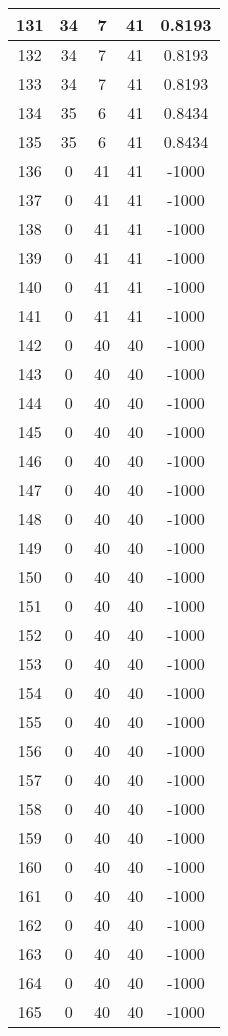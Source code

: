 \documentclass[letterpaper, 12pt]{article}
\begin{document}
\begin{longtable}{|c|c|c|c|c|}
\hline
131 & 34 & 7 & 41 & 0.8193 \\
\hline
132 & 34 & 7 & 41 & 0.8193 \\
\hline
133 & 34 & 7 & 41 & 0.8193 \\
\hline
134 & 35 & 6 & 41 & 0.8434 \\
\hline
135 & 35 & 6 & 41 & 0.8434 \\
\hline
136 & 0 & 41 & 41 & -1000 \\
\hline
137 & 0 & 41 & 41 & -1000 \\
\hline
138 & 0 & 41 & 41 & -1000 \\
\hline
139 & 0 & 41 & 41 & -1000 \\
\hline
140 & 0 & 41 & 41 & -1000 \\
\hline
141 & 0 & 41 & 41 & -1000 \\
\hline
142 & 0 & 40 & 40 & -1000 \\
\hline
143 & 0 & 40 & 40 & -1000 \\
\hline
144 & 0 & 40 & 40 & -1000 \\
\hline
145 & 0 & 40 & 40 & -1000 \\
\hline
146 & 0 & 40 & 40 & -1000 \\
\hline
147 & 0 & 40 & 40 & -1000 \\
\hline
148 & 0 & 40 & 40 & -1000 \\
\hline
149 & 0 & 40 & 40 & -1000 \\
\hline
150 & 0 & 40 & 40 & -1000 \\
\hline
151 & 0 & 40 & 40 & -1000 \\
\hline
152 & 0 & 40 & 40 & -1000 \\
\hline
153 & 0 & 40 & 40 & -1000 \\
\hline
154 & 0 & 40 & 40 & -1000 \\
\hline
155 & 0 & 40 & 40 & -1000 \\
\hline
156 & 0 & 40 & 40 & -1000 \\
\hline
157 & 0 & 40 & 40 & -1000 \\
\hline
158 & 0 & 40 & 40 & -1000 \\
\hline
159 & 0 & 40 & 40 & -1000 \\
\hline
160 & 0 & 40 & 40 & -1000 \\
\hline
161 & 0 & 40 & 40 & -1000 \\
\hline
162 & 0 & 40 & 40 & -1000 \\
\hline
163 & 0 & 40 & 40 & -1000 \\
\hline
164 & 0 & 40 & 40 & -1000 \\
\hline
165 & 0 & 40 & 40 & -1000 \\

\end{longtable}
\end{document}
